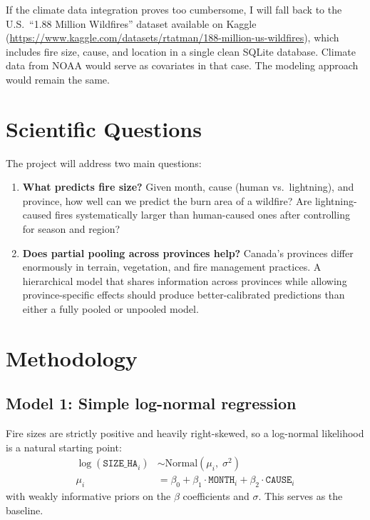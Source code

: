\documentclass[11pt]{article}
\begin{document}
If the climate data integration proves too cumbersome, I will fall back to the U.S.\ ``1.88 Million Wildfires'' dataset available on Kaggle (\url{https://www.kaggle.com/datasets/rtatman/188-million-us-wildfires}), which includes fire size, cause, and location in a single clean SQLite database. Climate data from NOAA would serve as covariates in that case. The modeling approach would remain the same.

\section{Scientific Questions}

The project will address two main questions:

\begin{enumerate}
    \item \textbf{What predicts fire size?} Given month, cause (human vs.\ lightning), and province, how well can we predict the burn area of a wildfire? Are lightning-caused fires systematically larger than human-caused ones after controlling for season and region?
    \item \textbf{Does partial pooling across provinces help?} Canada's provinces differ enormously in terrain, vegetation, and fire management practices. A hierarchical model that shares information across provinces while allowing province-specific effects should produce better-calibrated predictions than either a fully pooled or unpooled model.
\end{enumerate}

\section{Methodology}

\subsection{Model 1: Simple log-normal regression}

Fire sizes are strictly positive and heavily right-skewed, so a log-normal likelihood is a natural starting point:
%
\begin{align*}
\log(\texttt{SIZE\_HA}_i) &\sim \text{Normal}(\mu_i,\; \sigma^2) \\
\mu_i &= \beta_0 + \beta_1 \cdot \texttt{MONTH}_i + \beta_2 \cdot \texttt{CAUSE}_i
\end{align*}
%
with weakly informative priors on the $\beta$ coefficients and $\sigma$. This serves as the baseline.
\end{document}
